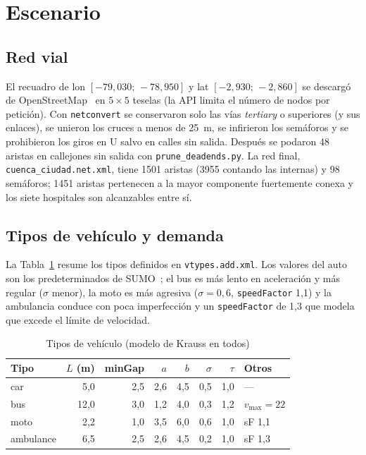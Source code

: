 \documentclass[conference,a4paper]{IEEEtran}
\begin{document}
\section{Escenario}
\subsection{Red vial}
El recuadro de lon $[-79{,}030;\,-78{,}950]$ y lat $[-2{,}930;\,-2{,}860]$ se descargó de
OpenStreetMap~\cite{osm} en $5\times5$ teselas (la API limita el número de nodos por
petición). Con \texttt{netconvert} se conservaron solo las vías \emph{tertiary} o
superiores (y sus enlaces), se unieron los cruces a menos de 25~m, se infirieron los
semáforos y se prohibieron los giros en U salvo en calles sin salida. Después se podaron
48 aristas en callejones sin salida con \texttt{prune\_deadends.py}. La red final,
\texttt{cuenca\_ciudad.net.xml}, tiene 1501 aristas (3955 contando las internas) y 98
semáforos; 1451 aristas pertenecen a la mayor componente fuertemente conexa y los siete
hospitales son alcanzables entre sí.

\subsection{Tipos de vehículo y demanda}
La Tabla~\ref{tab:vtypes} resume los tipos definidos en \texttt{vtypes.add.xml}. Los
valores del auto son los predeterminados de SUMO~\cite{vtypedef}; el bus es más lento en
aceleración y más regular ($\sigma$ menor), la moto es más agresiva ($\sigma=0{,}6$,
\texttt{speedFactor} 1,1) y la ambulancia conduce con poca imperfección y un
\texttt{speedFactor} de 1,3 que modela que excede el límite de velocidad.

\begin{table}[!t]
\centering
\caption{Tipos de vehículo (modelo de Krauss en todos)}
\label{tab:vtypes}
\footnotesize
\begin{tabular}{@{}lrrrrrrl@{}}
\toprule
Tipo & $L$ (m) & minGap & $a$ & $b$ & $\sigma$ & $\tau$ & Otros \\
\midrule
car       & 5,0  & 2,5 & 2,6 & 4,5 & 0,5 & 1,0 & --- \\
bus       & 12,0 & 3,0 & 1,2 & 4,0 & 0,3 & 1,2 & $v_{\max}=22$ \\
moto      & 2,2  & 1,0 & 3,5 & 6,0 & 0,6 & 1,0 & sF 1,1 \\
ambulance & 6,5  & 2,5 & 2,6 & 4,5 & 0,2 & 1,0 & sF 1,3 \\
\bottomrule
\end{tabular}
\end{table}
\end{document}
